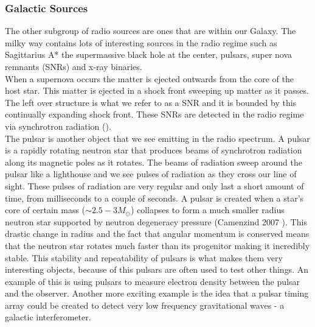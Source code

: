 \documentclass[10pt,a4paper]{article}
\begin{document}
\subsubsection{Galactic Sources}
The other subgroup of radio sources are ones that are within our Galaxy. The milky way contains lots of interesting sources in the radio regime such as Sagittarius A* the supermassive black hole at the center, pulsars, super nova remnants (SNRs) and x-ray binaries.\\

When a supernova occurs the matter is ejected outwards from the core of the host star. This matter is ejected in a shock front sweeping up matter as it passes. The left over structure is what we refer to as a SNR and it is bounded by this continually expanding shock front. These SNRs are detected in the radio regime via synchrotron radiation (\citet{Mayer}).\\

The pulsar is another object that we see emitting in the radio spectrum. A pulsar is a rapidly rotating neutron star that produces beams of synchrotron radiation along its magnetic poles as it rotates.  The beams of radiation sweep around the pulsar like a lighthouse and we see pulses of radiation as they cross our line of sight. These pulses of radiation are very regular and only last a short amount of time, from milliseconds to a couple of seconds. A pulsar is created when a star's core of certain mass ($\sim2.5-3 M_\odot$) collapses to form a much smaller radius neutron star supported by neutron degeneracy pressure (Camenzind 2007 \citet{Camezind}). This drastic change in radius and the fact that angular momentum is conserved means that the neutron star rotates much faster than its progenitor making it incredibly stable. This stability and repeatability of pulsars is what makes them very interesting objects, because of this pulsars are often used to test other things. An example of this is using pulsars to measure electron density between the pulsar and the observer. Another more exciting example is the idea that a pulsar timing array could be created to detect very low frequency gravitational waves - a galactic interferometer.\\
\end{document}
